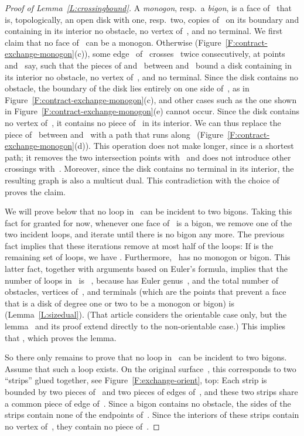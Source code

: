 \documentclass[11pt]{article}
\theoremstyle{plain}  \newtheorem{theorem}{Theorem}[section]
\theoremstyle{definition}
\begin{document}
\begin{proof}[Proof of Lemma~\ref{L:crossingbound}]
  A \emph{monogon}, resp.\ a \emph{bigon}, is a face of~ that is,
  topologically, an open disk with one, resp.\ two, copies of~ on its
  boundary and containing in its interior no obstacle, no vertex of~,
  and no terminal.  We first claim that no face of~ can be a monogon.
  Otherwise (Figure~\ref{F:contract-exchange-monogon}(c)), some edge~
  of~ crosses~ twice consecutively, at points  and~ say, such
  that the pieces of  and~ between  and~ bound a disk
  containing in its interior no obstacle, no vertex of~, and no
  terminal.  Since the disk contains no obstacle, the boundary of the disk
  lies entirely on one side of~, as in
  Figure~\ref{F:contract-exchange-monogon}(c), and other cases such as the
  one shown in Figure~\ref{F:contract-exchange-monogon}(e) cannot occur.
  Since the disk contains no vertex of~, it contains no piece of~
  in its interior.  We can thus replace the piece of~ between 
  and~ with a path that runs along~
  (Figure~\ref{F:contract-exchange-monogon}(d)).  This operation does not
  make  longer, since  is a shortest path; it removes the two
  intersection points with~ and does not introduce other crossings
  with~.  Moreover, since the disk contains no terminal in its interior,
  the resulting graph is also a multicut dual.  This contradiction with the
  choice of~ proves the claim.
 
  We will prove below that no loop in~ can be incident to two bigons.
  Taking this fact for granted for now, whenever one face of~ is a
  bigon, we remove one of the two incident loops, and iterate until there
  is no bigon any more.  The previous fact implies that these iterations
  remove at most half of the loops: If  is the remaining set of loops,
  we have .  Furthermore, ~has no monogon or bigon.  This
  latter fact, together with arguments based on Euler's formula, implies
  that the number of loops in~ is
  ~\cite[Lemma~2.1]{ccelw-scsh-08}, because  has Euler
  genus~, and the total number of obstacles, vertices of~, and
  terminals (which are the points that prevent a face that is a disk of
  degree one or two to be a monogon or bigon) is 
  (Lemma~\ref{L:sizedual}).  (That article considers the orientable case
  only, but the lemma~\cite[Lemma~2.1]{ccelw-scsh-08} and its proof extend
  directly to the non-orientable case.)  This implies that ,
  which proves the lemma.

  So there only remains to prove that no loop in~ can be incident to two
  bigons.  Assume that such a loop exists.  On the original surface~,
  this corresponds to two ``strips'' glued together, see
  Figure~\ref{F:exchange-orient}, top: Each strip is bounded by two pieces
  of~ and two pieces of edges of~, and these two strips share a
  common piece of edge of~.  Since a bigon contains no obstacle, the
  sides of the strips contain none of the endpoints of~.  Since the
  interiors of these strips contain no vertex of~, they contain no
  piece of~.


\end{proof}
\end{document}

